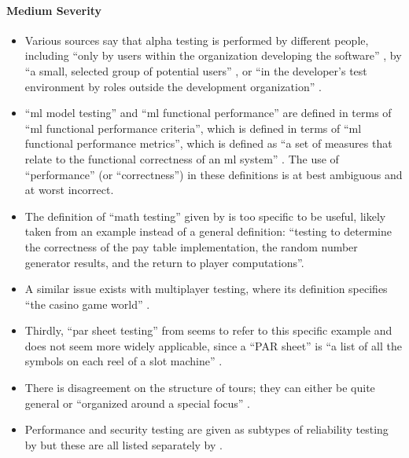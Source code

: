 \paragraph{Medium Severity}
\begin{itemize}\fi
      \item Various sources say that alpha testing is performed by different
            people, including ``only by users within the organization
            developing the software'' \citep[p.~17]{IEEE2017}, by ``a small,
            selected group of potential users'' \citep[p.~5-8]{SWEBOK2024}, or
            ``in the developer's test environment by roles outside the
            development organization'' \citepISTQB{}.
      \item ``\acf{ml} model testing'' and ``\acs{ml} functional performance''
            are defined in terms of ``\acs{ml} functional performance criteria'',
            which is defined in terms of ``\acs{ml} functional performance
            metrics'', which is defined as ``a set of measures that relate to the
            functional correctness of an \acs{ml} system'' \citepISTQB{}. The use
            of ``performance'' (or ``correctness'') in these definitions is at
            best ambiguous and at worst incorrect.
            \ifnotpaper
      \item The definition of ``math testing'' given by \citetISTQB{} is
            too specific to be useful, likely taken from an example instead of
            a general definition: ``testing to determine the correctness of the
            pay table implementation, the random number generator results, and
            the return to player computations''.
      \item A similar issue exists with multiplayer testing, where its
            definition specifies ``the casino game world'' \citepISTQB{}.
      \item Thirdly, ``par sheet testing'' from \citepISTQB{} seems to
            refer to this specific example and does not seem more widely
            applicable, since a ``PAR sheet'' is ``a list of all the symbols
            on each reel of a slot machine'' \citep{Bluejay2024}.\fi
      \item There is disagreement on the structure of tours; they can either be
            quite general \citep[p.~34]{IEEE2022} or ``organized around a
            special focus'' \citepISTQB{}.
      \item Performance and security testing are given as subtypes of
            reliability testing by \citep{ISO_IEC2023a} but
            these are all listed separately by \citet[p.~53]{Firesmith2015}.
\end{itemize}


